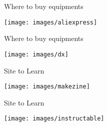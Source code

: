 \documentclass{beamer}
\begin{document}
\begin{darkframes}
\begin{frame}[<+->]{Where to buy equipments}
	\begin{center}
		\texttt{[image: images/aliexpress]} 
	\end{center}
\end{frame}

\begin{frame}[<+->]{Where to buy equipments}
	\begin{center}
		\texttt{[image: images/dx]} 
	\end{center}
\end{frame}

\begin{frame}[<+->]{Site to Learn}
	\begin{center}
		\texttt{[image: images/makezine]} 
	\end{center}
\end{frame}

\begin{frame}[<+->]{Site to Learn}
	\begin{center}
		\texttt{[image: images/instructable]} 
	\end{center}
\end{frame}

    \end{darkframes}
\end{document}
